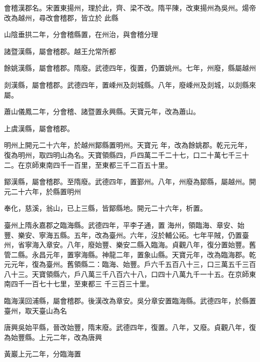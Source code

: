 \begin{pinyinscope}
 會稽漢郡名。宋置東揚州，理於此，齊、梁不改。隋平陳，改東揚州為吳州。煬帝改為越州，尋改會稽郡，皆立於
 此縣



 山陰垂拱二年，分會稽縣置，在州治，與會稽分理



 諸暨漢縣，屬會稽郡。越王允常所都



 餘姚漢縣，屬會稽郡。隋廢。武德四年，復置，仍置姚州。七年，州廢，縣屬越州



 剡漢縣，屬會稽郡。武德四年，置嵊州及剡城縣。八年，廢嵊州及剡城，以剡縣來屬。



 蕭山儀鳳二年，分會稽、諸暨置永興縣。天寶元年，改為蕭山。



 上虞漢縣，屬會稽郡。



 明州上開元二十六年，於越州鄮縣置明州。天寶元
 年，改為餘姚郡。乾元元年，復為明州，取四明山為名。天寶領縣四，戶四萬二千二十七，口二十萬七千三十二。在京師東南四千一百里，至東都三千二百五十里。



 鄮漢縣，屬會稽郡。至隋廢。武德四年，置鄞州。八年，州廢為鄮縣，屬越州。開元二十六年，於縣置明州



 奉化，慈溪，翁山，已上三縣，皆鄮縣地。開元二十六年，析置。



 臺州上隋永嘉郡之臨海縣。武德四年，平李子通，置
 海州，領臨海、章安、始豐、樂安、寧海五縣。五年，改為臺州。六年，沒於輔公祏。七年平賊，仍置臺州，省寧海入章安。八年，廢始豐、樂安二縣入臨海。貞觀八年，復分置始豐。舊管二縣。永昌元年，置寧海縣。神龍二年，置象山縣。天寶元年，改為臨海郡。乾元元年，復為臺州。舊領縣二：臨海、始豐。戶六千五百八十三，口三萬五千三百八十三。天寶領縣六，戶八萬三千八百六十八，口四十八萬九千一十五。在京師東南四千一百七十七里，至東都三
 千三百三十里。



 臨海漢回浦縣，屬會稽郡。後漢改為章安。吳分章安置臨海縣。武德四年，於縣置臺州，取天臺山為名



 唐興吳始平縣，晉改始豐，隋末廢。武德四年，復置。八年，又廢。貞觀八年，復為始豐縣。上元二年，改為唐興



 黃巖上元二年，分臨海置




\end{pinyinscope}
